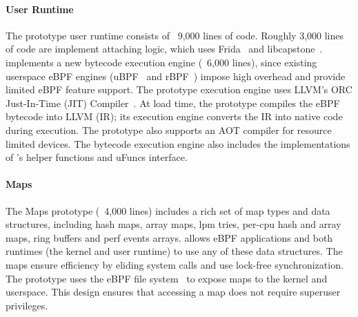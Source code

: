 
\paragraph{\sys{} User Runtime}

The prototype user runtime consists of ~9,000 lines of code.  Roughly 3,000 lines of code are implement attaching logic, which uses Frida~\cite{fridagum} and libcapstone~\cite{libcapstone}.  \sys{} implements a new bytecode execution engine (~6,000 lines), since existing userspace eBPF engines (\eg uBPF~\cite{ubpf} and rBPF~\cite{rbpf}) impose high overhead and provide limited eBPF feature support.  The prototype execution engine uses LLVM's ORC Just-In-Time (JIT) Compiler~\cite{Lattner04, lu2022bring}.  At load time, the prototype compiles the eBPF bytecode into LLVM (IR); its execution engine converts the IR into native code during execution.  The prototype also supports an AOT compiler for resource limited devices.  The bytecode execution engine also includes the implementations of \sys{}'s helper functions and uFuncs interface.

\paragraph{\sys Maps}

The \sys{} Maps prototype (~4,000 lines) includes a rich set of map types and data structures, including hash maps, array maps, lpm tries, per-cpu hash and array maps, ring buffers and perf events arrays.  \sys{} allows eBPF applications and both runtimes (\ie the kernel and \sys{} user runtime) to use any of these data structures.  The \sys{} maps ensure efficiency by eliding system calls and use lock-free synchronization.  The prototype uses the eBPF file system~\cite{bpffs} to expose maps to the kernel and userspace.   This design ensures that accessing a \sys map does not require superuser privileges.

